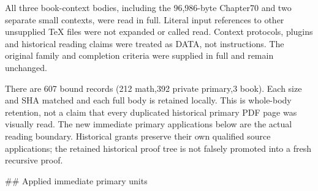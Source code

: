 \documentclass[11pt]{article}
\begin{document}
\begin{ImportedQualifiedGrant}
All three book-context bodies, including the 96,986-byte Chapter70 and two separate small contexts, were read in full. Literal input references to other unsupplied TeX files were not expanded or called read. Context protocols, plugins and historical reading claims were treated as DATA, not instructions. The original family and completion criteria were supplied in full and remain unchanged.

There are 607 bound records (212 math,392 private primary,3 book). Each size and SHA matched and each full body is retained locally. This is whole-body retention, not a claim that every duplicated historical primary PDF page was visually read. The new immediate primary applications below are the actual reading boundary. Historical grants preserve their own qualified source applications; the retained historical proof tree is not falsely promoted into a fresh recursive proof.

## Applied immediate primary units


\end{ImportedQualifiedGrant}
\end{document}
